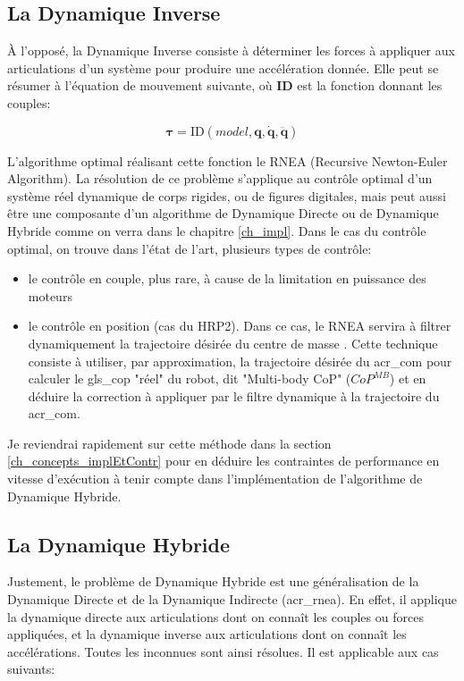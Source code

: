 \documentclass{report}
\begin{document}
\subsection{La Dynamique Inverse}

\`{A} l'opposé, la Dynamique Inverse consiste à déterminer les forces à appliquer aux articulations d'un système pour produire une accélération donnée. Elle peut se résumer à l'équation de mouvement suivante, où \textbf{ID} est la fonction donnant les couples:

\begin{equation}
\mathbf{\tau} = \mathrm{ID}(model,\mathbf{q,\dot{q},\ddot{q}})
\end{equation}

L'algorithme optimal réalisant cette fonction le RNEA (Recursive Newton-Euler Algorithm). La résolution de ce problème s'applique au contrôle optimal d'un système réel dynamique de corps rigides, ou de figures digitales, mais peut aussi être une composante d'un algorithme de Dynamique Directe ou de Dynamique Hybride comme on verra dans le chapitre \ref{ch_impl}. Dans le cas du contrôle optimal, on trouve dans l'état de l'art, plusieurs types de contrôle:
\begin{itemize}
\item le contrôle en couple, plus rare, à cause de la limitation en puissance des moteurs
\item le contrôle en position (cas du HRP2). Dans ce cas, le RNEA servira à filtrer dynamiquement la trajectoire désirée du centre de masse \cite{bib_filtrageTrajectoireCoM}. Cette technique consiste à utiliser, par approximation, la trajectoire désirée du \gls{acr_com} pour calculer le \gls{gls_cop} "réel" du robot, dit "Multi-body CoP" ($CoP^{MB}$) et en déduire la correction à appliquer par le filtre dynamique à la trajectoire du \gls{acr_com}.
\end{itemize}

Je reviendrai rapidement sur cette méthode dans la section \ref{ch_concepts_implEtContr} pour en déduire les contraintes de performance en vitesse d'exécution à tenir compte dans l'implémentation de l'algorithme de Dynamique Hybride.

\subsection{La Dynamique Hybride}

Justement, le problème de Dynamique Hybride est une généralisation de la Dynamique Directe et de la Dynamique Indirecte (\gls{acr_rnea}). En effet, il applique la dynamique directe aux articulations dont on connaît les couples ou forces appliquées, et la dynamique inverse aux articulations dont on connaît les accélérations. Toutes les inconnues sont ainsi résolues. Il est applicable aux cas suivants:
\end{document}
